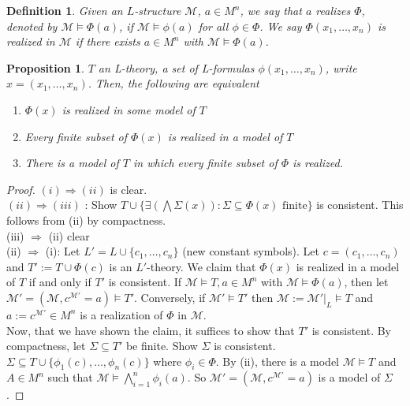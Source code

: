 \documentclass[letterpaper, 12pt]{article}
\newcommand{\cM}{\mathcal{M}}
\theoremstyle{stdthm}
\newtheorem{prop}[thm]{Proposition}
\theoremstyle{stddef}
\newtheorem{defn}[thm]{Definition}
\theoremstyle{stdnonum}
\theoremstyle{stdqands}
\theoremstyle{stdbold}
\begin{document}
\begin{defn}
Given an $L$-structure $\cM$, $a \in M^n$, we say that $a$ \emph{realizes} $\Phi$, denoted by $\cM \models \Phi(a)$, if $\cM \models \phi(a)$ for all $\phi \in \Phi$.  We say $\Phi(x_1,\dots, x_n)$ is \emph{realized} in $\cM$ if there exists $a \in M^n$ with $\cM \models \Phi(a)$. 
\end{defn}

\begin{prop} \label{prop1}
$T$ an L-theory, a set of L-formulas $\phi(x_1,\dots, x_n)$, write $x = (x_1,\dots, x_n)$. Then, the following are equivalent
\begin{enumerate}
\item $\Phi(x)$ is realized in some model of $T$
\item Every finite subset of $\Phi(x)$ is realized in a model of $T$
\item There is a model of $T$ in which every finite subset of $\Phi$ is realized. 
\end{enumerate}
\end{prop}

\begin{proof}
$(i) \Rightarrow (ii)$ is clear. \\

\noindent $(ii) \Rightarrow (iii)$ : Show $T \cup \{ \exists (\bigwedge \Sigma(x)): \Sigma \subseteq \Phi(x) \mbox{ finite} \}$ is consistent. This follows from (ii) by compactness. \\ 

\noindent (iii) $\Rightarrow$ (ii) clear\\

\noindent (ii) $\Rightarrow$ (i): Let $L' = L \cup \{c_1,\dots, c_n\}$ (new constant symbols). Let $c= (c_1,\dots, c_n)$ and $T' := T \cup \Phi(c)$ is an $L'$-theory. We claim that $\Phi(x)$ is realized in a model of $T$ if and only if $T'$ is consistent. If $\cM \models T, a \in M^n$ with $\cM \models \Phi(a)$, then let $\cM' = (\cM, c^{\cM'} = a) \models T'$. Conversely, if $\cM' \models T'$ then $\cM := \cM'|_L \models T$ and $a:= c^{\cM'} \in M^n$ is a realization of $\Phi$ in $\cM$. \\

Now, that we have shown the claim, it suffices to show that $T'$ is consistent. By compactness, let $\Sigma \subseteq T'$ be finite. Show $\Sigma$ is consistent.  $\Sigma \subseteq T \cup \{\phi_1(c), \dots, \phi_n(c)\}$ where $\phi_i \in \Phi$. By (ii), there is a model $\cM \models T$ and $A \in M^n$ such that $\cM \models \bigwedge_{i=1}^n \phi_i(a)$. So $\cM' = (\cM, c^{\cM'} = a)$ is a model of $\Sigma$. 
\end{proof}
\end{document}
